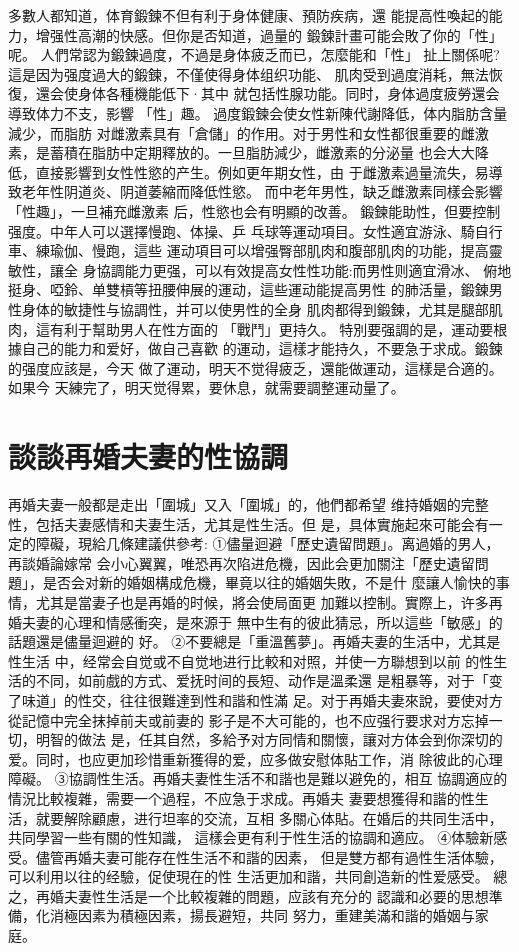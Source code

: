 \documentclass[12pt,UTF8]{ctexbook}
\begin{document}
多數人都知道，体育鍛鍊不但有利于身体健康、預防疾病，還
能提高性喚起的能力，增强性高潮的快感。但你是否知道，過量的
鍛鍊計畫可能会敗了你的「性」呢。
人們常認为鍛鍊過度，不過是身体疲乏而已，怎麼能和「性」
扯上關係呢?這是因为强度過大的鍛鍊，不僅使得身体组织功能、
肌肉受到過度消耗，無法恢復，還会使身体各種機能低下·其中
就包括性腺功能。同时，身体過度疲勞還会導致体力不支，影響
「性」趣。
過度鍛鍊会使女性新陳代謝降低，体内脂肪含量減少，而脂肪
对雌激素具有「倉儲」的作用。对于男性和女性都很重要的雌激
素，是蓄積在脂肪中定期釋放的。一旦脂肪減少，雌激素的分泌量
也会大大降低，直接影響到女性性慾的产生。例如更年期女性，由
于雌激素過量流失，易導致老年性阴道炎、阴道萎縮而降低性慾。
而中老年男性，缺乏雌激素同樣会影響「性趣」，一旦補充雌激素
后，性慾也会有明顯的改善。
鍛鍊能助性，但要控制强度。中年人可以選擇慢跑、体操、乒
乓球等運动項目。女性適宜游泳、騎自行車、練瑜伽、慢跑，這些
運动項目可以增强臀部肌肉和腹部肌肉的功能，提高靈敏性，讓全
身協調能力更强，可以有效提高女性性功能:而男性则適宜滑冰、
俯地挺身、啞鈴、单雙槓等扭腰伸展的運动，這些運动能提高男性
的肺活量，鍛鍊男性身体的敏捷性与協調性，并可以使男性的全身
肌肉都得到鍛鍊，尤其是腿部肌肉，這有利于幫助男人在性方面的
「戰鬥」更持久。
特別要强調的是，運动要根據自己的能力和爱好，做自己喜歡
的運动，這樣才能持久，不要急于求成。鍛鍊的强度应該是，今天
做了運动，明天不觉得疲乏，還能做運动，這樣是合適的。如果今
天練完了，明天觉得累，要休息，就需要調整運动量了。

\section{談談再婚夫妻的性協調}

再婚夫妻一般都是走出「圍城」又入「圍城」的，他們都希望
维持婚姻的完整性，包括夫妻感情和夫妻生活，尤其是性生活。但
是，具体實施起來可能会有一定的障礙，現給几條建議供參考:
①儘量迴避「歷史遺留問題」。离過婚的男人，再談婚論嫁常
会小心翼翼，唯恐再次陷进危機，因此会更加關注「歷史遺留問
題」，是否会对新的婚姻構成危機，畢竟以往的婚姻失敗，不是什
麼讓人愉快的事情，尤其是當妻子也是再婚的时候，將会使局面更
加難以控制。實際上，许多再婚夫妻的心理和情感衝突，是來源于
無中生有的彼此猜忌，所以這些「敏感」的話題還是儘量迴避的
好。
②不要總是「重溫舊夢」。再婚夫妻的生活中，尤其是性生活
中，经常会自觉或不自觉地进行比較和对照，并使一方聯想到以前
的性生活的不同，如前戲的方式、爱抚时间的長短、动作是溫柔還
是粗暴等，对于「变了味道」的性交，往往很難達到性和諧和性滿
足。对于再婚夫妻來說，要使对方從記憶中完全抹掉前夫或前妻的
影子是不大可能的，也不应强行要求对方忘掉一切，明智的做法
是，任其自然，多給予对方同情和關懷，讓对方体会到你深切的
爱。同时，也应更加珍惜重新獲得的爱，应多做安慰体貼工作，消
除彼此的心理障礙。
③協調性生活。再婚夫妻性生活不和諧也是難以避免的，相互
協調適应的情況比較複雜，需要一个過程，不应急于求成。再婚夫
妻要想獲得和諧的性生活，就要解除顧慮，进行坦率的交流，互相
多關心体貼。在婚后的共同生活中，共同學習一些有關的性知識，
這樣会更有利于性生活的協調和適应。
④体驗新感受。儘管再婚夫妻可能存在性生活不和諧的因素，
但是雙方都有過性生活体驗，可以利用以往的经驗，促使現在的性
生活更加和諧，共同創造新的性爱感受。
總之，再婚夫妻性生活是一个比較複雜的問題，应該有充分的
認識和必要的思想準備，化消極因素为積極因素，揚長避短，共同
努力，重建美滿和諧的婚姻与家庭。
\end{document}

